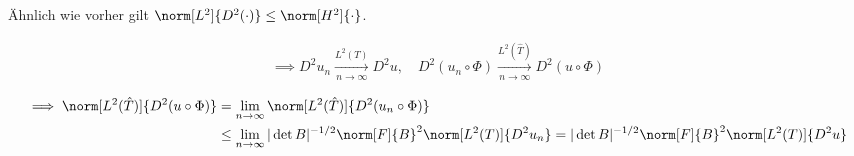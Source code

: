 \begin{solution}
Ähnlich wie vorher gilt $\norm[L^2]{D^2 (\cdot)} \leq \norm[H^2]{\cdot}$.

\begin{align*}
  \implies
  D^2 u_n \xrightarrow[n \to \infty]{L^2(T)} D^2 u,
  \quad
  D^2 (u_n \circ \Phi) \xrightarrow[n \to \infty]{L^2(\hat T)} D^2 (u \circ \Phi)
\end{align*}


\begin{align*}
  \implies
  \norm[L^2(\hat T)]{D^2(u\circ\Phi)}
  &=
  \lim_{n \to \infty}
  \norm[L^2(\hat T)]{D^2(u_n\circ\Phi)} \\
  &\leq
  \lim_{n \to \infty}
  |\det B|^{-1/2}
  \norm[F]{B}^2
  \norm[L^2(T)]{D^2 u_n}
  =
  |\det B|^{-1/2}
  \norm[F]{B}^2
  \norm[L^2(T)]{D^2 u}
\end{align*}

\end{solution}

